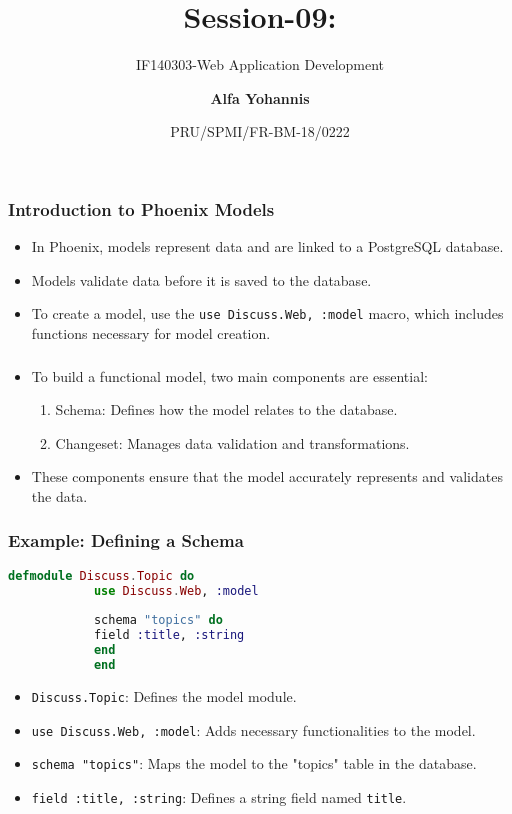\documentclass[aspectratio=169, table]{beamer}
\subtitle{IF140303-Web Application Development}
\title{\LARGE{Session-09:\\ \shortstack{Creating Forms and Routing in Phoenix}}
	\vspace{20pt}}
\date[Serial]{\scriptsize {PRU/SPMI/FR-BM-18/0222}}
\author[Pradita]{\small{\textbf{Alfa Yohannis}}}
\begin{document}
	
	\frame{\titlepage}
	\begin{frame}
		\frametitle{Introduction to Phoenix Models}
		\begin{itemize}
			\item In Phoenix, models represent data and are linked to a PostgreSQL database.
			\item Models validate data before it is saved to the database.
			\item To create a model, use the \texttt{use Discuss.Web, :model} macro, which includes functions necessary for model creation.
		\end{itemize}
	\end{frame}
	
	\begin{frame}
		\frametitle{}
		\begin{itemize}
			\item To build a functional model, two main components are essential:
			\begin{enumerate}
				\item Schema: Defines how the model relates to the database.
				\item Changeset: Manages data validation and transformations.
			\end{enumerate}
			\item These components ensure that the model accurately represents and validates the data.
		\end{itemize}
	\end{frame}
	
	\begin{frame}[fragile]
		\frametitle{Example: Defining a Schema}
		\begin{lstlisting}[language=Elixir]
			defmodule Discuss.Topic do
			use Discuss.Web, :model
			
			schema "topics" do
			field :title, :string
			end
			end
		\end{lstlisting}
		\begin{itemize}
			\item \texttt{Discuss.Topic}: Defines the model module.
			\item \texttt{use Discuss.Web, :model}: Adds necessary functionalities to the model.
			\item \texttt{schema "topics"}: Maps the model to the "topics" table in the database.
			\item \texttt{field :title, :string}: Defines a string field named \texttt{title}.
		\end{itemize}
	\end{frame}
	
\end{document}
